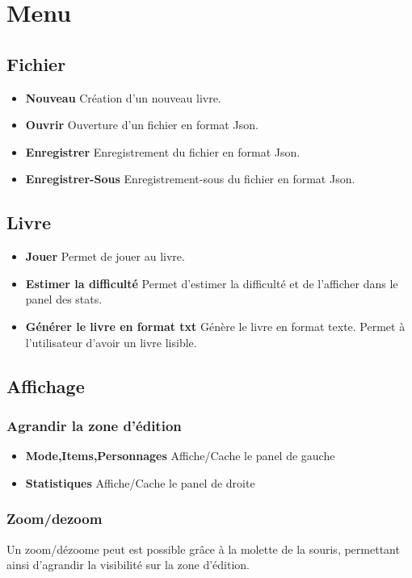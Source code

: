 \chapter{Menu}

	\section{Fichier}
		\begin{itemize}
			\item \textbf{Nouveau} Création d'un nouveau livre.
			\item \textbf{Ouvrir} Ouverture d'un fichier en format Json.
			\item \textbf{Enregistrer} Enregistrement du fichier en format Json.
			\item \textbf{Enregistrer-Sous} Enregistrement-sous du fichier en format Json.
		\end{itemize}

	\section{Livre}
		\begin{itemize}
			\item \textbf{Jouer} Permet de jouer au livre.
			\item \textbf{Estimer la difficulté} Permet d'estimer la difficulté et de l'afficher dans le panel des stats.
			\item \textbf{Générer le livre en format txt} Génère le livre en format texte. Permet à l'utilisateur d'avoir un livre lisible.
		\end{itemize}

	\section{Affichage}

		\subsection{Agrandir la zone d'édition}
			\begin{itemize}
				\item \textbf{Mode,Items,Personnages} Affiche/Cache le panel de gauche
				\item \textbf{Statistiques} Affiche/Cache le panel de droite
			\end{itemize}

		\subsection{Zoom/dezoom}
			Un zoom/dézoome peut est possible grâce à la molette de la souris, permettant ainsi d'agrandir la visibilité sur la zone d'édition.
